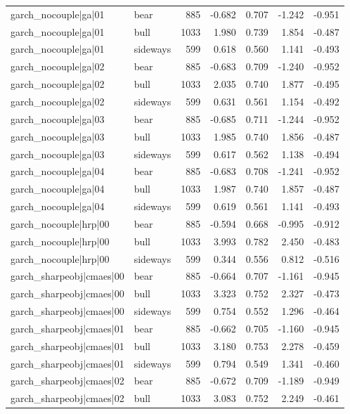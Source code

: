 \begin{table}
\begin{tabular}{llrrrrr}
garch\_nocouple|ga|01 & bear & 885 & -0.682 & 0.707 & -1.242 & -0.951 \\
garch\_nocouple|ga|01 & bull & 1033 & 1.980 & 0.739 & 1.854 & -0.487 \\
garch\_nocouple|ga|01 & sideways & 599 & 0.618 & 0.560 & 1.141 & -0.493 \\
garch\_nocouple|ga|02 & bear & 885 & -0.683 & 0.709 & -1.240 & -0.952 \\
garch\_nocouple|ga|02 & bull & 1033 & 2.035 & 0.740 & 1.877 & -0.495 \\
garch\_nocouple|ga|02 & sideways & 599 & 0.631 & 0.561 & 1.154 & -0.492 \\
garch\_nocouple|ga|03 & bear & 885 & -0.685 & 0.711 & -1.244 & -0.952 \\
garch\_nocouple|ga|03 & bull & 1033 & 1.985 & 0.740 & 1.856 & -0.487 \\
garch\_nocouple|ga|03 & sideways & 599 & 0.617 & 0.562 & 1.138 & -0.494 \\
garch\_nocouple|ga|04 & bear & 885 & -0.683 & 0.708 & -1.241 & -0.952 \\
garch\_nocouple|ga|04 & bull & 1033 & 1.987 & 0.740 & 1.857 & -0.487 \\
garch\_nocouple|ga|04 & sideways & 599 & 0.619 & 0.561 & 1.141 & -0.493 \\
garch\_nocouple|hrp|00 & bear & 885 & -0.594 & 0.668 & -0.995 & -0.912 \\
garch\_nocouple|hrp|00 & bull & 1033 & 3.993 & 0.782 & 2.450 & -0.483 \\
garch\_nocouple|hrp|00 & sideways & 599 & 0.344 & 0.556 & 0.812 & -0.516 \\
garch\_sharpeobj|cmaes|00 & bear & 885 & -0.664 & 0.707 & -1.161 & -0.945 \\
garch\_sharpeobj|cmaes|00 & bull & 1033 & 3.323 & 0.752 & 2.327 & -0.473 \\
garch\_sharpeobj|cmaes|00 & sideways & 599 & 0.754 & 0.552 & 1.296 & -0.464 \\
garch\_sharpeobj|cmaes|01 & bear & 885 & -0.662 & 0.705 & -1.160 & -0.945 \\
garch\_sharpeobj|cmaes|01 & bull & 1033 & 3.180 & 0.753 & 2.278 & -0.459 \\
garch\_sharpeobj|cmaes|01 & sideways & 599 & 0.794 & 0.549 & 1.341 & -0.460 \\
garch\_sharpeobj|cmaes|02 & bear & 885 & -0.672 & 0.709 & -1.189 & -0.949 \\
garch\_sharpeobj|cmaes|02 & bull & 1033 & 3.083 & 0.752 & 2.249 & -0.461 \\

\end{tabular}
\end{table}
